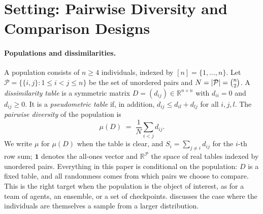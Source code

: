 \documentclass[twoside,11pt]{article}
\newcommand{\R}{\mathbb{R}}
\DeclarePairedDelimiter{\abs}{\lvert}{\rvert}
\newcommand{\SND}{\mu}
\newcommand{\Pairs}{\mathcal{P}}
\newcommand{\one}{\mathbf{1}}
\begin{document}
\section{Setting: Pairwise Diversity and Comparison Designs}
\label{sec:setting}

\paragraph{Populations and dissimilarities.}
A population consists of $n\ge 4$ individuals, indexed by $[n]=\{1,\dots,n\}$.
Let $\Pairs=\{\{i,j\}:1\le i<j\le n\}$ be the set of unordered pairs and
$N=\abs{\Pairs}=\binom{n}{2}$. A \emph{dissimilarity table} is a symmetric
matrix $D=(d_{ij})\in\R^{n\times n}$ with $d_{ii}=0$ and $d_{ij}\ge 0$. It
is a \emph{pseudometric table} if, in addition, $d_{ij}\le d_{il}+d_{lj}$
for all $i,j,l$. The \emph{pairwise diversity} of the population is
\begin{equation}
  \SND(D) \;=\; \frac{1}{N}\sum_{i<j} d_{ij}.
  \label{eq:mu}
\end{equation}
We write $\SND$ for $\SND(D)$ when the table is clear, and $S_i=\sum_{j\ne
i}d_{ij}$ for the $i$-th row sum; $\one$ denotes the all-ones vector and $\R^{\Pairs}$ the space of real tables indexed by unordered pairs. Everything in this paper is conditional
on the population: $D$ is a fixed table, and all randomness comes from
which pairs we choose to compare. This is the right target when the
population is the object of interest, as for a team of agents, an ensemble,
or a set of checkpoints.  discusses the case where the
individuals are themselves a sample from a larger distribution.

\end{document}
